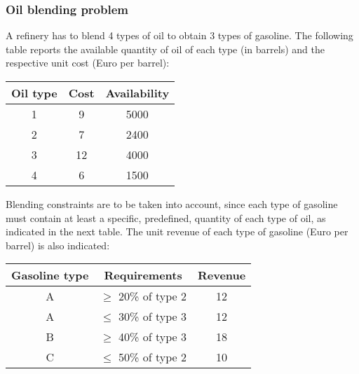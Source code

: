 \subsubsection{Oil blending problem}

A refinery has to blend 4 types of oil to obtain 3 types of gasoline. The following table reports the available quantity of oil of each type (in barrels) and the respective unit cost (Euro per barrel):

\begin{table}[!htp]
    \centering
    \begin{tabular}{@{} c c c @{}}
        \toprule
        \textbf{Oil type} & \textbf{Cost} & \textbf{Availability} \\
        \midrule
        1 & 9   & 5000 \\
        2 & 7   & 2400 \\
        3 & 12  & 4000 \\
        4 & 6   & 1500 \\
        \bottomrule
    \end{tabular}
\end{table}

\noindent
Blending constraints are to be taken into account, since each type of gasoline must contain at least a specific, predefined, quantity of each type of oil, as indicated in the next table. The unit revenue of each type of gasoline (Euro per barrel) is also indicated:

\begin{table}[!htp]
    \centering
    \begin{tabular}{@{} c c c @{}}
        \toprule
        \textbf{Gasoline type} & \textbf{Requirements} & \textbf{Revenue} \\
        \midrule
        A & $\geq$ 20\% of type 2 & 12 \\
        A & $\leq$ 30\% of type 3 & 12 \\
        B & $\geq$ 40\% of type 3 & 18 \\
        C & $\leq$ 50\% of type 2 & 10 \\
        \bottomrule
    \end{tabular}
\end{table}

